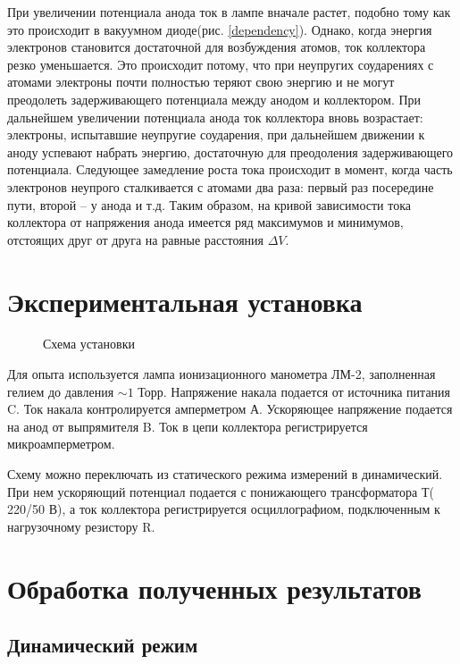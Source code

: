 \documentclass{physlab}
\begin{document}
При увеличении потенциала анода ток в лампе вначале растет, подобно тому как это происходит в вакуумном диоде(рис. \ref{dependency}). Однако, когда энергия электронов становится достаточной для возбуждения атомов, ток коллектора резко уменьшается. Это происходит потому, что при неупругих соударениях с атомами электроны почти полностью теряют свою энергию и не могут преодолеть задерживающего потенциала между анодом и коллектором. При дальнейшем увеличении потенциала анода ток коллектора вновь возрастает: электроны, испытавшие неупругие соударения, при дальнейшем движении к аноду успевают набрать энергию, достаточную для преодоления задерживающего потенциала. Следующее замедление роста тока происходит в момент, когда часть электронов неупрого сталкивается с атомами два раза: первый раз посередине пути, второй -- у анода и т.д. Таким образом, на кривой зависимости тока коллектора от напряжения анода имеется ряд максимумов и минимумов, отстоящих друг от друга на равные расстояния $\Delta V$.

\section{Экспериментальная установка}

\begin{wrapfigure}{r}{0.5\linewidth} \label{fullscheme} 
\vspace{-5ex}  
\caption{Схема установки}
\end{wrapfigure}


Для опыта используется лампа ионизационного манометра ЛМ-2, заполненная гелием до давления $\sim 1$ Торр. Напряжение накала подается от источника питания C. Ток накала контролируется амперметром А. Ускоряющее напряжение подается на анод от выпрямителя B. Ток в цепи коллектора регистрируется микроамперметром.

Схему можно переключать из статического режима измерений в динамический. При нем ускоряющий потенциал подается с понижающего трансформатора Т( 220/50 В), а ток коллектора регистрируется осциллографиом, подключенным к нагрузочному резистору R. 


\section{Обработка полученных результатов}

\subsection{Динамический режим}
\end{document}
